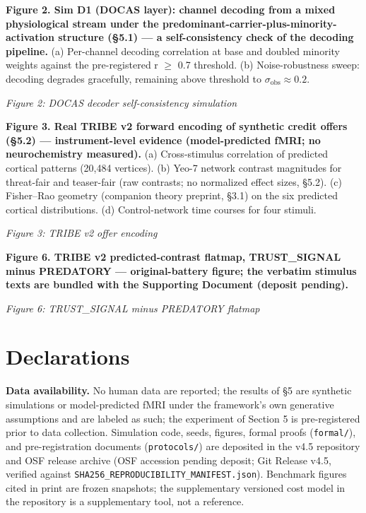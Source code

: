 \documentclass[11pt,twocolumn]{article}
\theoremstyle{plain}
\begin{document}
\textbf{Figure 2. Sim D1 (DOCAS layer): channel decoding from a mixed physiological stream under the predominant-carrier-plus-minority-activation structure (\S{}5.1) — a self-consistency check of the decoding pipeline.} (a) Per-channel decoding correlation at base and doubled minority weights against the pre-registered r $\geq$ 0.7 threshold. (b) Noise-robustness sweep: decoding degrades gracefully, remaining above threshold to $\sigma_{\mathrm{obs}} \approx 0.2$.

\textit{Figure 2: DOCAS decoder self-consistency simulation}

\textbf{Figure 3. Real TRIBE v2 forward encoding of synthetic credit offers (\S{}5.2) — instrument-level evidence (model-predicted fMRI; no neurochemistry measured).} (a) Cross-stimulus correlation of predicted cortical patterns (20,484 vertices). (b) Yeo-7 network contrast magnitudes for threat-fair and teaser-fair (raw contrasts; no normalized effect sizes, \S{}5.2). (c) Fisher–Rao geometry (companion theory preprint, \S{}3.1) on the six predicted cortical distributions. (d) Control-network time courses for four stimuli.

\textit{Figure 3: TRIBE v2 offer encoding}

\textbf{Figure 6. TRIBE v2 predicted-contrast flatmap, TRUST\_SIGNAL minus PREDATORY — original-battery figure; the verbatim stimulus texts are bundled with the Supporting Document (deposit pending).}

\textit{Figure 6: TRUST\_SIGNAL minus PREDATORY flatmap}




\FloatBarrier
\section*{Declarations}

\textbf{Data availability.} No human data are reported; the results of \S{}5 are synthetic simulations or model-predicted fMRI under the framework's own generative assumptions and are labeled as such; the experiment of Section 5 is pre-registered prior to data collection. Simulation code, seeds, figures, formal proofs (\texttt{formal/}), and pre-registration documents (\texttt{protocols/}) are deposited in the v4.5 repository and OSF release archive (OSF accession pending deposit; Git Release v4.5, verified against \texttt{SHA256\_REPRODUCIBILITY\_MANIFEST.json}). Benchmark figures cited in print are frozen snapshots; the supplementary versioned cost model in the repository is a supplementary tool, not a reference.
\end{document}
